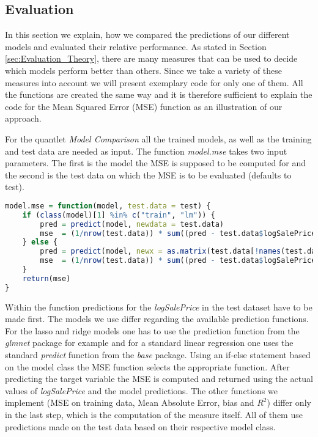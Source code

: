 \subsection{Evaluation}\label{sec:Evaluation_Implementation}
In this section we explain, how we compared the predictions of our different models and evaluated their relative performance. As stated in Section \ref{sec:Evaluation_Theory}, there are many measures that can be used to decide which models perform better than others. Since we take a variety of these measures into account we will present exemplary code for only one of them. All the functions are created the same way and it is therefore sufficient to explain the code for the Mean Squared Error (MSE) function as an illustration of our approach.

For the quantlet \textit{Model Comparison} all the trained models, as well as the training and test data are needed as input. The function \textit{model.mse} takes two input parameters. The first is the model the MSE is supposed to be computed for and the second is the test data on which the MSE is to be evaluated (defaults to test). 
\begin{lstlisting}[language=R]
model.mse = function(model, test.data = test) {
    if (class(model)[1] %in% c("train", "lm")) {
        pred = predict(model, newdata = test.data)
        mse  = (1/nrow(test.data)) * sum((pred - test.data$logSalePrice)^2)
    } else {
        pred = predict(model, newx = as.matrix(test.data[!names(test.data) %in% "logSalePrice"]), s = "lambda.1se")
        mse  = (1/nrow(test.data)) * sum((pred - test.data$logSalePrice)^2)
    }
    return(mse)
}
\end{lstlisting}
Within the function predictions for the \textit{logSalePrice} in the test dataset have to be made first. The models we use differ regarding the available prediction functions. For the lasso and ridge models one has to use the prediction function from the \textit{glmnet} package for example and for a standard linear regression one uses the standard \textit{predict} function from the \textit{base} package. Using an if-else statement based on the model class the MSE function selects the appropriate function. After predicting the target variable the MSE is computed and returned using the actual values of \textit{logSalePrice} and the model predictions. The other functions we implement (MSE on training data, Mean Absolute Error, bias and $R^2$) differ only in the last step, which is the computation of the measure itself. All of them use predictions made on the test data based on their respective model class. 


